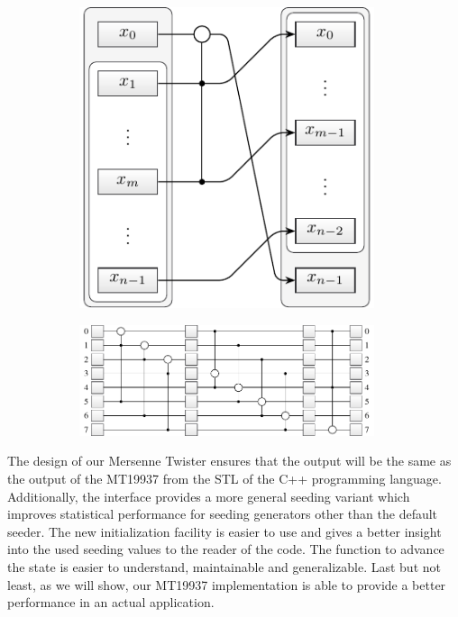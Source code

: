 \documentclass{stdlocal}
\begin{document}
    \begin{figure}
      \center
      \begin{subfigure}[b]{0.3\textwidth}
        \center
        \includegraphics[width=0.95\textwidth]{figures/mt19937_transition_short.pdf}
      \end{subfigure}
      \begin{subfigure}[b]{0.68\textwidth}
        \center
        \includegraphics[width=0.95\textwidth]{figures/mt19937_loop_scheme.pdf}
      \end{subfigure}
      \caption[Mersenne Twister Loop Scheme]{}
      \label{fig:mt-loop-scheme}
    \end{figure}

    The design of our Mersenne Twister ensures that the output will be the same as the output of the MT19937 from the STL of the C++ programming language.
    Additionally, the interface provides a more general seeding variant which improves statistical performance for seeding generators other than the default seeder.
    The new initialization facility is easier to use and gives a better {}insight into the used seeding values to the reader of the code.
    The function to advance the state is easier to understand, maintainable and generalizable.
    Last but not least, as we will show, our MT19937 implementation is able to provide a better performance in an actual application.
\end{document}
